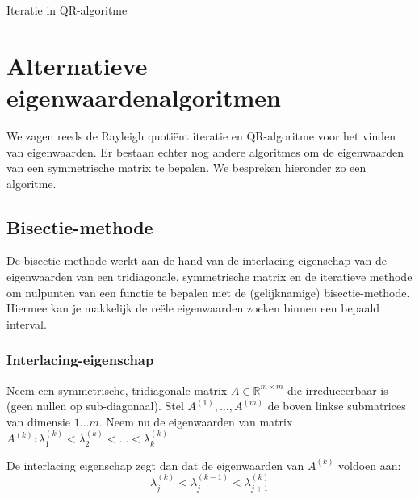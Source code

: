 \documentclass[a4paper]{article}
\begin{document}
\begin{algorithm}[H]
	\caption{Iteratie in QR-algoritme}
\end{algorithm}

\section{Alternatieve eigenwaardenalgoritmen}
	We zagen reeds de Rayleigh quotiënt iteratie en QR-algoritme voor het vinden van eigenwaarden. Er bestaan echter nog andere algoritmes om de eigenwaarden van een symmetrische matrix te bepalen. We bespreken hieronder zo een algoritme.
\subsection{Bisectie-methode}
	De bisectie-methode werkt aan de hand van de interlacing eigenschap van de eigenwaarden van een tridiagonale, symmetrische matrix en de iteratieve methode om nulpunten van een functie te bepalen met de (gelijknamige) bisectie-methode. Hiermee kan je makkelijk de reële eigenwaarden zoeken binnen een bepaald interval.
\subsubsection{Interlacing-eigenschap}
	Neem een symmetrische, tridiagonale matrix $A \in \mathbb{R}^{m\times m} $ die irreduceerbaar is (geen nullen op sub-diagonaal).
	Stel $A^{(1)},\dots ,A^{(m)}$ de boven linkse submatrices van dimensie $1\dots m$.
	Neem nu de eigenwaarden van matrix $A^{(k)}: \lambda _1^{(k)} < \lambda _2^{(k)} < \dots < \lambda _k^{(k)}$
	
	\noindent De interlacing eigenschap zegt dan dat de eigenwaarden van $A^{(k)}$ voldoen aan:
	\begin{equation}
		\lambda _j^{(k)} < \lambda_j^{(k-1)} < \lambda_{j+1}^{(k)}
	\end{equation}
	
\end{document}
